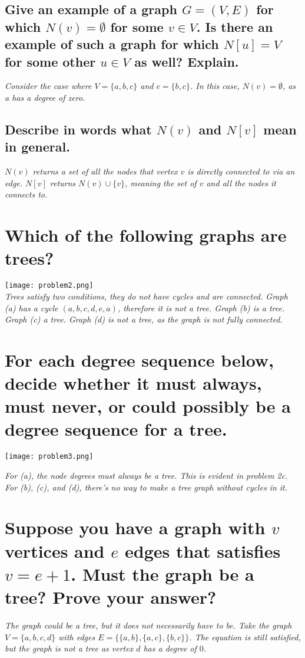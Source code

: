 \documentclass{article}
\begin{document}
\subsection{Give an example of a graph $G=(V,E)$ for which $N(v) = \emptyset$ for some $v\in V$. Is there an example of such a graph for which $N[u]=V$ for some other $u\in V$ as well? Explain.}
\hspace{1cm}\textit{Consider the case where $V=\{a,b,c\}$ and $e=\{b,c\}$. In this case, $N(v)=\emptyset$, as a has a degree of zero.}
\subsection{Describe in words what $N(v)$ and $N[v]$ mean in general.}
\hspace{1cm}\textit{$N(v)$ returns a set of all the nodes that vertex $v$ is directly connected to via an edge. $N[v]$ returns $N(v)\cup\{v\}$, meaning the set of $v$ and all the nodes it connects to.}
\clearpage


\section{Which of the following graphs are trees?}
\texttt{[image: problem2.png]} \\

\textit{Trees satisfy two conditions, they do not have cycles and are connected. Graph (a) has a cycle $(a,b,c,d,e,a)$, therefore it is not a tree. Graph (b) is a tree. Graph (c) a tree. Graph (d) is not a tree, as the graph is not fully connected.}




\section{For each degree sequence below, decide whether it must always, must never, or could possibly be a degree sequence for a tree.}
\hspace{1cm}\texttt{[image: problem3.png]}

\textit{For (a), the node degrees must always be a tree. This is evident in problem 2c. For (b), (c), and (d), there's no way to make a tree graph without cycles in it.}


\section{Suppose you have a graph with $v$ vertices and $e$ edges that satisfies $v=e+1$. Must the graph be a tree? Prove your answer?}
\textit{The graph could be a tree, but it does not necessarily have to be. Take the graph $V=\{a,b,c,d\}$ with edges $E=\{\{a,b\},\{a,c\},\{b,c\}\}$. The equation is still satisfied, but the graph is not a tree as vertex $d$ has a degree of $0$.}
\clearpage
\end{document}
